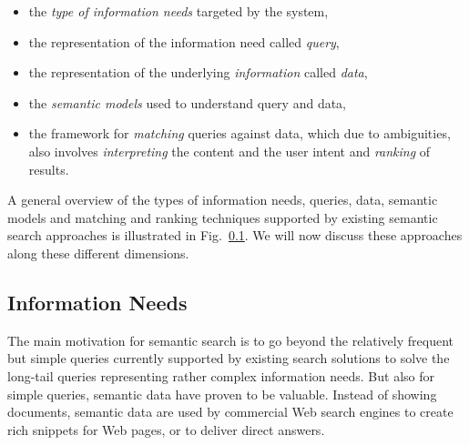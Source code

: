 \begin{itemize}
\item the \emph{type of information needs} targeted by the system,  
\item the representation of the information need called \textit{query}, 
\item the representation of the underlying \textit{information} called \emph{data}, 
\item the \emph{semantic models} used to understand query and data, 
\item the framework for \emph{matching} queries against data, which due to ambiguities, also involves \emph{interpreting} the content and the user intent and \emph{ranking} of results.  
\end{itemize}


A general overview of the types of information needs, queries, data, semantic models and matching and ranking techniques supported by existing semantic search approaches is illustrated in Fig.~\ref{}. We will now discuss these approaches along these different dimensions. 

\subsection{Information Needs}
The main motivation for semantic search is to go beyond the relatively frequent but simple queries currently supported by existing search solutions to solve the long-tail queries representing rather complex information needs. But also for simple queries, semantic data have proven to be valuable. Instead of showing documents, semantic data are used by commercial Web search engines to create rich snippets for Web pages, or to deliver direct answers. 


